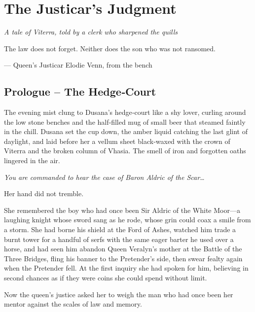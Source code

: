 \documentclass[11pt]{book}
\begin{document}
\chapter*{The Justicar's Judgment}

\vspace{2cm}
\begin{center}
\textit{A tale of Viterra, told by a clerk who sharpened the quills}
\end{center}
\vspace{1cm}

\epigraph{The law does not forget. Neither does the son who was not ransomed.}{--- Queen's Justicar Elodie Venn, from the bench}

\section*{Prologue – The Hedge‑Court}
The evening mist clung to Dusana's hedge‑court like a shy lover, curling around the low stone benches and the half‑filled mug of small beer that steamed faintly in the chill. Dusana set the cup down, the amber liquid catching the last glint of daylight, and laid before her a vellum sheet black‑waxed with the crown of Viterra and the broken column of Vhasia. The smell of iron and forgotten oaths lingered in the air.

\bigskip
\textit{You are commanded to hear the case of Baron Aldric of the Scar…}

\bigskip
Her hand did not tremble.

She remembered the boy who had once been Sir Aldric of the White Moor—a laughing knight whose sword sang as he rode, whose grin could coax a smile from a storm. She had borne his shield at the Ford of Ashes, watched him trade a burnt tower for a handful of serfs with the same eager barter he used over a horse, and had seen him abandon Queen Veralyn’s mother at the Battle of the Three Bridges, fling his banner to the Pretender’s side, then swear fealty again when the Pretender fell. At the first inquiry she had spoken for him, believing in second chances as if they were coins she could spend without limit.

Now the queen’s justice asked her to weigh the man who had once been her mentor against the scales of law and memory.

\end{document}

